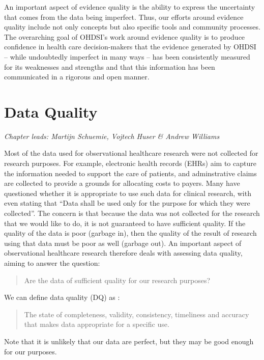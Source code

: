 \documentclass[11pt]{book}
\theoremstyle{definition}
\theoremstyle{definition}
\theoremstyle{definition}
\theoremstyle{remark}
\begin{document}
An important aspect of evidence quality is the ability to express the uncertainty that comes from the data being imperfect. Thus, our efforts around evidence quality include not only concepts but also specific tools and community processes. The overarching goal of OHDSI's work around evidence quality is to produce confidence in health care decision-makers that the evidence generated by OHDSI -- while undoubtedly imperfect in many ways -- has been consistently measured for its weaknesses and strengths and that this information has been communicated in a rigorous and open manner.

\hypertarget{DataQuality}{%
\chapter{Data Quality}\label{DataQuality}}

\emph{Chapter leads: Martijn Schuemie, Vojtech Huser \& Andrew Williams}

Most of the data used for observational healthcare research were not collected for research purposes. For example, electronic health records (EHRs) aim to capture the information needed to support the care of patients, and adminstrative claims are collected to provide a grounds for allocating costs to payers. Many have questioned whether it is appropriate to use such data for clinical research, with \citet{vanDerLei_1991} even stating that ``Data shall be used only for the purpose for which they were collected''. The concern is that because the data was not collected for the research that we would like to do, it is not guaranteed to have sufficient quality. If the quality of the data is poor (garbage in), then the quality of the result of research using that data must be poor as well (garbage out). An important aspect of observational healthcare research therefore deals with assessing data quality, aiming to answer the question:

\begin{quote}
Are the data of sufficient quality for our research purposes?
\end{quote}

We can define data quality (DQ) as \citep{roebuck_2012}: 

\begin{quote}
The state of completeness, validity, consistency, timeliness and accuracy that makes data appropriate for a specific use.
\end{quote}

Note that it is unlikely that our data are perfect, but they may be good enough for our purposes.
\end{document}
